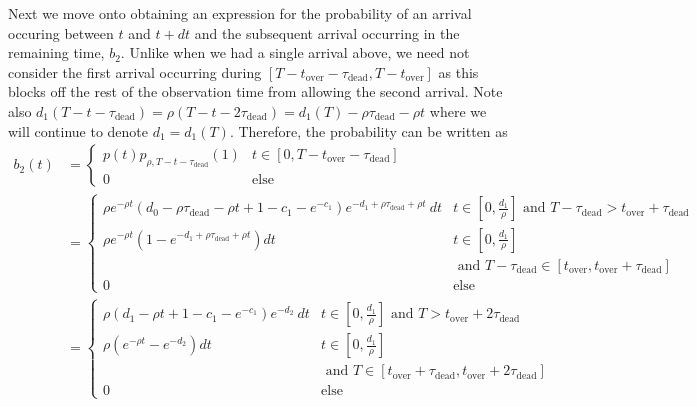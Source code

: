 \documentclass{article}
\newcommand{\dead}{\tau_{\text{dead}}}
\newcommand{\overlap}{t_{\text{over}}}
\begin{document}
Next we move onto obtaining an expression for the probability 
of an arrival occuring between $t$ and $t + dt$ and the subsequent
arrival occurring in the remaining time, $b_2$.
Unlike when we had a single arrival above, we need not consider the first arrival occurring
during $[T - \overlap - \dead, T - \overlap]$ as this blocks off the rest of the
observation time from allowing the second arrival.
Note also $d_1(T - t - \dead) = \rho(T - t - 2 \dead) = d_1(T) - \rho \dead - \rho t$
where we will continue to denote $d_1 = d_1(T)$.
Therefore, the probability can be written as
\begin{subequations}
\begin{align}
	b_2(t)
	  &= \begin{cases}
			   p(t) p_{\rho, T - t - \dead}(1) & t \in [0, T - \overlap - \dead]\\
				 0                                & \text{else}
			 \end{cases}\nonumber\\
	  &= \begin{cases}
			\rho e^{-\rho t} \left( d_0 - \rho \dead - \rho t + 1 - c_1 - e^{-c_1}\right)e^{-d_1 + \rho \dead + \rho t}~dt & t \in \left[0, \frac{d_1}{\rho}\right] \text{ and } T - \dead > \overlap + \dead\\
				 \rho e^{-\rho t}(1 - e^{-d_1 + \rho \dead + \rho t})dt                                                               & t \in \left[0, \frac{d_1}{\rho}\right] \\
				  & \text{ and } T - \dead \in [\overlap, \overlap + \dead]\\
			    0                                                                                         & \text{else}
			 \end{cases}\nonumber\\
	  &= \begin{cases}
			\rho \left( d_1 - \rho t + 1 - c_1 - e^{-c_1}\right)e^{-d_2}~dt & t \in \left[0, \frac{d_1}{\rho}\right] \text{ and } T > \overlap + 2 \dead\\
				 \rho (e^{-\rho t} - e^{-d_2})dt                                                               & t \in \left[0, \frac{d_1}{\rho}\right] \\
				  & \text{ and } T \in [\overlap + \dead, \overlap + 2 \dead]\\
			    0                                                                                         & \text{else}
		\end{cases}\label{eq:b_2-pre}
\end{align}

\end{subequations}
\end{document}
